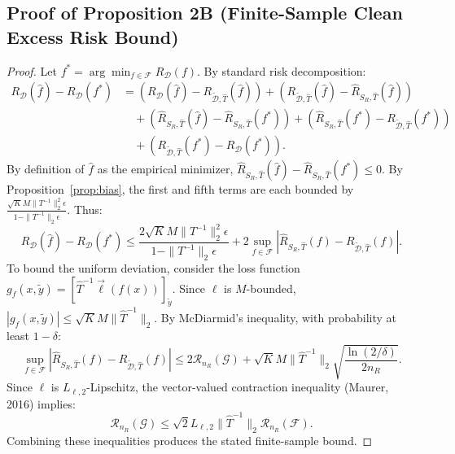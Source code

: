 \documentclass[10pt,twocolumn]{article}
\theoremstyle{definition}
\begin{document}
\subsection{Proof of Proposition 2B (Finite-Sample Clean Excess Risk Bound)}
\begin{proof}
Let $f^* = \arg\min_{f \in \mathcal{F}} R_{\mathcal{D}}(f)$. By standard risk decomposition:
\begin{align}
R_{\mathcal{D}}(\hat{f}) - R_{\mathcal{D}}(f^*) &= \left( R_{\mathcal{D}}(\hat{f}) - R_{\tilde{\mathcal{D}}, \hat{T}}(\hat{f}) \right) + \left( R_{\tilde{\mathcal{D}}, \hat{T}}(\hat{f}) - \hat{R}_{S_R, \hat{T}}(\hat{f}) \right) \\
&\quad + \left( \hat{R}_{S_R, \hat{T}}(\hat{f}) - \hat{R}_{S_R, \hat{T}}(f^*) \right) + \left( \hat{R}_{S_R, \hat{T}}(f^*) - R_{\tilde{\mathcal{D}}, \hat{T}}(f^*) \right) \\
&\quad + \left( R_{\tilde{\mathcal{D}}, \hat{T}}(f^*) - R_{\mathcal{D}}(f^*) \right).
\end{align}
By definition of $\hat{f}$ as the empirical minimizer, $\hat{R}_{S_R, \hat{T}}(\hat{f}) - \hat{R}_{S_R, \hat{T}}(f^*) \le 0$. By Proposition~\ref{prop:bias}, the first and fifth terms are each bounded by $\frac{\sqrt{K} M \|T^{-1}\|_2^2 \epsilon}{1 - \|T^{-1}\|_2 \epsilon}$. Thus:
\begin{equation}
R_{\mathcal{D}}(\hat{f}) - R_{\mathcal{D}}(f^*) \le \frac{2 \sqrt{K} M \|T^{-1}\|_2^2 \epsilon}{1 - \|T^{-1}\|_2 \epsilon} + 2 \sup_{f \in \mathcal{F}} \left| \hat{R}_{S_R, \hat{T}}(f) - R_{\tilde{\mathcal{D}}, \hat{T}}(f) \right|.
\end{equation}
To bound the uniform deviation, consider the loss function $g_f(x, \tilde{y}) = [\hat{T}^{-1} \vec{\ell}(f(x))]_{\tilde{y}}$. Since $\ell$ is $M$-bounded, $|g_f(x, \tilde{y})| \le \sqrt{K} M \|\hat{T}^{-1}\|_2$. By McDiarmid's inequality, with probability at least $1 - \delta$:
\begin{equation}
\sup_{f \in \mathcal{F}} \left| \hat{R}_{S_R, \hat{T}}(f) - R_{\tilde{\mathcal{D}}, \hat{T}}(f) \right| \le 2 \mathcal{R}_{n_R}(\mathcal{G}) + \sqrt{K} M \|\hat{T}^{-1}\|_2 \sqrt{\frac{\ln(2/\delta)}{2 n_R}}.
\end{equation}
Since $\ell$ is $L_{\ell, 2}$-Lipschitz, the vector-valued contraction inequality (Maurer, 2016) implies:
\begin{equation}
\mathcal{R}_{n_R}(\mathcal{G}) \le \sqrt{2} L_{\ell, 2} \|\hat{T}^{-1}\|_2 \mathcal{R}_{n_R}(\mathcal{F}).
\end{equation}
Combining these inequalities produces the stated finite-sample bound.
\end{proof}
\end{document}
